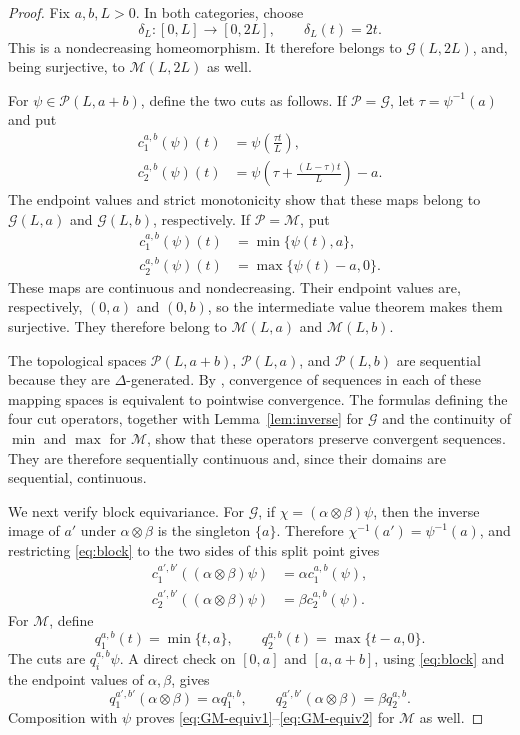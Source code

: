 \documentclass[12pt,a4paper]{amsart}
\newcommand{\Pcat}{\mathcal P}
\newcommand{\G}{\mathcal G}
\newcommand{\M}{\mathcal M}
\theoremstyle{definition}
\begin{document}
\begin{proof}
Fix \(a,b,L>0\).  In both categories, choose
\begin{equation}\label{eq:GM-delta}
 \delta_L:[0,L]\longrightarrow[0,2L],\qquad
 \delta_L(t)=2t.
\end{equation}
This is a nondecreasing homeomorphism.  It therefore belongs to \(\G(L,2L)\), and, being surjective, to \(\M(L,2L)\) as well.

For \(\psi\in\Pcat(L,a+b)\), define the two cuts as follows.  If \(\Pcat=\G\), let \(\tau=\psi^{-1}(a)\) and put
\begin{align}
 c^{a,b}_1(\psi)(t)
  &=\psi\left(\frac{\tau t}{L}\right),                \label{eq:G-cut1}\\
 c^{a,b}_2(\psi)(t)
  &=\psi\left(\tau+\frac{(L-\tau)t}{L}\right)-a.     \label{eq:G-cut2}
\end{align}
The endpoint values and strict monotonicity show that these maps belong to \(\G(L,a)\) and \(\G(L,b)\), respectively.  If \(\Pcat=\M\), put
\begin{align}
 c^{a,b}_1(\psi)(t)&=\min\{\psi(t),a\},                \label{eq:M-cut1}\\
 c^{a,b}_2(\psi)(t)&=\max\{\psi(t)-a,0\}.             \label{eq:M-cut2}
\end{align}
These maps are continuous and nondecreasing.  Their endpoint values are, respectively, \((0,a)\) and \((0,b)\), so the intermediate value theorem makes them surjective.  They therefore belong to \(\M(L,a)\) and \(\M(L,b)\).

The topological spaces \(\Pcat(L,a+b)\), \(\Pcat(L,a)\), and \(\Pcat(L,b)\) are sequential because they are \(\Delta\)-generated. By \cite[Proposition~3]{Moore3}, convergence of sequences in each of these mapping spaces is equivalent to pointwise convergence. The formulas defining the four cut operators, together with Lemma~\ref{lem:inverse} for \(\G\) and the continuity of \(\min\) and \(\max\) for \(\M\), show that these operators preserve convergent sequences. They are therefore sequentially continuous and, since their domains are sequential, continuous.


We next verify block equivariance.  For \(\G\), if \(\chi=(\alpha\otimes\beta)\psi\), then the inverse image of \(a'\) under \(\alpha\otimes\beta\) is the singleton \(\{a\}\).  Therefore \(\chi^{-1}(a')=\psi^{-1}(a)\), and restricting \eqref{eq:block} to the two sides of this split point gives
\begin{align}
 c^{a',b'}_1((\alpha\otimes\beta)\psi)
   &=\alpha c^{a,b}_1(\psi),                          \label{eq:GM-equiv1}\\
 c^{a',b'}_2((\alpha\otimes\beta)\psi)
   &=\beta c^{a,b}_2(\psi).                          \label{eq:GM-equiv2}
\end{align}
For \(\M\), define
\[
 q^{a,b}_1(t)=\min\{t,a\},\qquad
 q^{a,b}_2(t)=\max\{t-a,0\}.
\]
The cuts are \(q_i^{a,b}\psi\).  A direct check on \([0,a]\) and \([a,a+b]\), using \eqref{eq:block} and the endpoint values of
\(\alpha,\beta\), gives
\[
 q^{a',b'}_1(\alpha\otimes\beta)=\alpha q^{a,b}_1,
 \qquad
 q^{a',b'}_2(\alpha\otimes\beta)=\beta q^{a,b}_2.
\]
Composition with \(\psi\) proves \eqref{eq:GM-equiv1}--\eqref{eq:GM-equiv2} for \(\M\) as well.


\end{proof}
\end{document}
